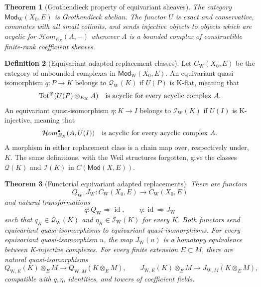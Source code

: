 \documentclass[10pt]{article}
\newtheorem{theorem}{Theorem}[section]
\theoremstyle{definition}
\newtheorem{definition}[theorem]{Definition}
\begin{document}
\begin{theorem}[Grothendieck property of equivariant sheaves]
The category \(\mathsf{Mod}_{\mathrm W}(X_0,E)\) is Grothendieck abelian.
The functor \(U\) is exact and conservative, commutes with all small
colimits, and sends injective objects to objects which are acyclic for
\(\mathcal Hom_{E_X}(A,-)\) whenever \(A\) is a bounded complex of
constructible finite-rank coefficient sheaves.
\end{theorem}

\begin{definition}[Equivariant adapted replacement classes]
Let \(C_{\mathrm W}(X_0,E)\) be the category of unbounded complexes in
\(\mathsf{Mod}_{\mathrm W}(X_0,E)\).  An equivariant quasi-isomorphism
\(q:P\to K\) belongs to \(\mathcal Q_{\mathrm W}(K)\) if \(U(P)\) is
K-flat, meaning that
\[
 \operatorname{Tot}^{\oplus}(U(P)\otimes_{E_X}A)
 \quad\hbox{is acyclic for every acyclic complex }A.
\]
An equivariant quasi-isomorphism \(\eta:K\to I\) belongs to
\(\mathcal I_{\mathrm W}(K)\) if \(U(I)\) is K-injective, meaning that
\[
 \mathcal Hom_{E_X}^{\bullet}(A,U(I))
 \quad\hbox{is acyclic for every acyclic complex }A.
\]
A morphism in either replacement class is a chain map over, respectively
under, \(K\).  The same definitions, with the Weil structures forgotten,
give the classes \(\mathcal Q(K)\) and \(\mathcal I(K)\) in
\(C(\mathsf{Mod}(X,E))\).
\end{definition}

\begin{theorem}[Functorial equivariant adapted replacements]
There are functors
\[
 Q_{\mathrm W},J_{\mathrm W}:C_{\mathrm W}(X_0,E)
                  \longrightarrow C_{\mathrm W}(X_0,E)
\]
and natural transformations
\[
 q:Q_{\mathrm W}\Longrightarrow\operatorname{id},
 \qquad \eta:\operatorname{id}\Longrightarrow J_{\mathrm W}
\]
such that \(q_K\in\mathcal Q_{\mathrm W}(K)\) and
\(\eta_K\in\mathcal I_{\mathrm W}(K)\) for every \(K\).  Both functors
send equivariant quasi-isomorphisms to equivariant quasi-isomorphisms.
For every equivariant quasi-isomorphism \(u\), the map
\(J_{\mathrm W}(u)\) is a homotopy equivalence between K-injective
complexes.
For every finite extension \(E\subset M\), there are natural
quasi-isomorphisms
\[
 Q_{\mathrm W,E}(K)\otimes_E M\longrightarrow
 Q_{\mathrm W,M}(K\otimes_E M),
 \qquad
 J_{\mathrm W,E}(K)\otimes_E M\longrightarrow
 J_{\mathrm W,M}(K\otimes_E M),
\]
compatible with \(q,\eta\), identities, and towers of coefficient fields.
\end{theorem}
\end{document}
